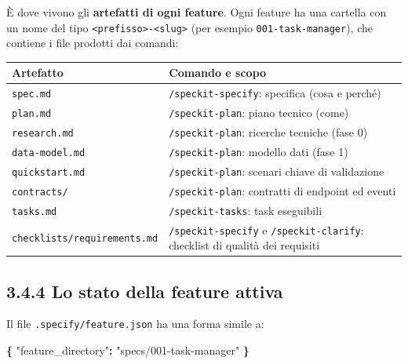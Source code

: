 \documentclass[
  italian,
  10pt,
]{book}
\newenvironment{Shaded}{\begin{snugshade}}{\end{snugshade}}
\newcommand{\DataTypeTok}[1]{\textcolor[rgb]{0.13,0.29,0.53}{#1}}
\newcommand{\FunctionTok}[1]{\textcolor[rgb]{0.13,0.29,0.53}{\textbf{#1}}}
\newcommand{\StringTok}[1]{\textcolor[rgb]{0.31,0.60,0.02}{#1}}
\newcounter{none} %
\begin{document}
È dove vivono gli \textbf{artefatti di ogni feature}. Ogni feature ha
una cartella con un nome del tipo
\texttt{\textless{}prefisso\textgreater{}-\textless{}slug\textgreater{}}
(per esempio \texttt{001-task-manager}), che contiene i file prodotti
dai comandi:

{\def\LTcaptype{none} %
\begin{longtable}[]{@{}
  >{\raggedright\arraybackslash}p{}
  >{\raggedright\arraybackslash}p{}@{}}
\toprule\noalign{}
\begin{minipage}[b]{\linewidth}\raggedright
Artefatto
\end{minipage} & \begin{minipage}[b]{\linewidth}\raggedright
Comando e scopo
\end{minipage} \\
\midrule\noalign{}
\endhead
\bottomrule\noalign{}
\endlastfoot
\texttt{spec.md} & \texttt{/speckit-specify}: specifica (cosa e
perché) \\
\texttt{plan.md} & \texttt{/speckit-plan}: piano tecnico (come) \\
\texttt{research.md} & \texttt{/speckit-plan}: ricerche tecniche (fase
0) \\
\texttt{data-model.md} & \texttt{/speckit-plan}: modello dati (fase
1) \\
\texttt{quickstart.md} & \texttt{/speckit-plan}: scenari chiave di
validazione \\
\texttt{contracts/} & \texttt{/speckit-plan}: contratti di endpoint ed
eventi \\
\texttt{tasks.md} & \texttt{/speckit-tasks}: task eseguibili \\
\texttt{checklists/requirements.md} & \texttt{/speckit-specify} e
\texttt{/speckit-clarify}: checklist di qualità dei requisiti \\
\end{longtable}
}

\subsection{3.4.4 Lo stato della feature
attiva}\label{lo-stato-della-feature-attiva}

Il file \texttt{.specify/feature.json} ha una forma simile a:

\begin{Shaded}
\begin{Highlighting}[]
\FunctionTok{\{}
  \DataTypeTok{"feature\_directory"}\FunctionTok{:} \StringTok{"specs/001{-}task{-}manager"}
\FunctionTok{\}}
\end{Highlighting}
\end{Shaded}
\end{document}
